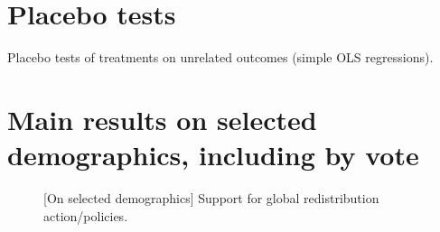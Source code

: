 \section{Placebo tests}\label{app:placebo}


\begin{table}[!htbp] 
  \caption{Placebo tests of treatments on unrelated outcomes (simple OLS regressions).} \label{tab:placebo} 
  \makebox[\textwidth][c]{}
\end{table} 


\clearpage
\section{Main results on selected demographics, including by vote}\label{app:pol}

\begin{figure}[h!]
    \caption[{[}On selected demographics{]} Support for broad or radical global redistribution]{[On selected demographics] Support for global redistribution action/policies. %
    }\label{fig:main_radical_redistr_pol} 
\end{figure}

